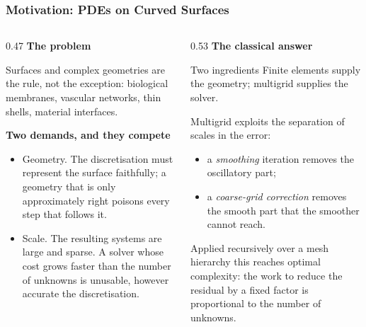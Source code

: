 \frametitle{Motivation: PDEs on Curved Surfaces}
\small

\begin{columns}[T]

\begin{column}{0.47\textwidth}
\textbf{The problem}

Surfaces and complex geometries are the rule, not the exception: biological
membranes, vascular networks, thin shells, material interfaces.

\vspace{0.5em}
\textbf{Two demands, and they compete}

\begin{itemize}
  \item \alert{Geometry}. The discretisation must represent the surface
        faithfully; a geometry that is only approximately right poisons every
        step that follows it.
  \item \alert{Scale}. The resulting systems are large and sparse. A solver
        whose cost grows faster than the number of unknowns is unusable,
        however accurate the discretisation.
\end{itemize}
\end{column}

\begin{column}{0.53\textwidth}
\textbf{The classical answer}

\begin{block}{Two ingredients}
\alert{Finite elements} supply the geometry; \alert{multigrid} supplies the
solver.
\end{block}

Multigrid exploits the \alert{separation of scales} in the error:

\begin{itemize}
  \item a \emph{smoothing} iteration removes the oscillatory part;
  \item a \emph{coarse-grid correction} removes the smooth part that the
        smoother cannot reach.
\end{itemize}

Applied recursively over a mesh hierarchy this reaches \alert{optimal
complexity}: the work to reduce the residual by a fixed factor is proportional
to the number of unknowns.
\end{column}

\end{columns}

